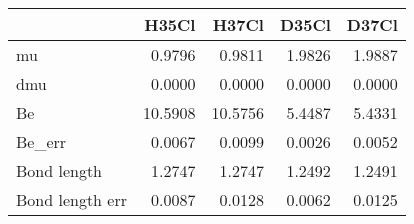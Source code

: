 \begin{tabular}{lrrrr}
\toprule
{} &   H35Cl &   H37Cl &  D35Cl &  D37Cl \\
\midrule
mu              &  0.9796 &  0.9811 & 1.9826 & 1.9887 \\
dmu             &  0.0000 &  0.0000 & 0.0000 & 0.0000 \\
Be              & 10.5908 & 10.5756 & 5.4487 & 5.4331 \\
Be\_err          &  0.0067 &  0.0099 & 0.0026 & 0.0052 \\
Bond length     &  1.2747 &  1.2747 & 1.2492 & 1.2491 \\
Bond length err &  0.0087 &  0.0128 & 0.0062 & 0.0125 \\
\bottomrule
\end{tabular}
